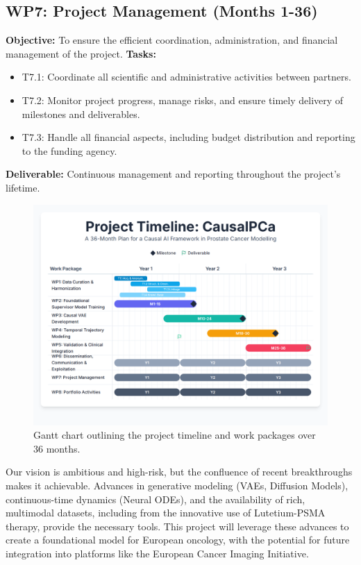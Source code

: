 \documentclass[11pt, a4paper]{article}
\begin{document}
\subsection*{WP7: Project Management (Months 1-36)}
\textbf{Objective:} To ensure the efficient coordination, administration, and financial management of the project.
\textbf{Tasks:}
\begin{itemize}
    \item T7.1: Coordinate all scientific and administrative activities between partners.
    \item T7.2: Monitor project progress, manage risks, and ensure timely delivery of milestones and deliverables.
    \item T7.3: Handle all financial aspects, including budget distribution and reporting to the funding agency.
\end{itemize}
\textbf{Deliverable:} Continuous management and reporting throughout the project's lifetime.

\begin{figure}[H]
    \centering
    \includegraphics[width=1\textwidth]{gantt.png}
    \caption{Gantt chart outlining the project timeline and work packages over 36 months.}
    \label{fig:gantt_chart}
\end{figure}

Our vision is ambitious and high-risk, but the confluence of recent breakthroughs makes it achievable. Advances in generative modeling (VAEs, Diffusion Models), continuous-time dynamics (Neural ODEs), and the availability of rich, multimodal datasets, including from the innovative use of Lutetium-PSMA therapy, provide the necessary tools. This project will leverage these advances to create a foundational model for European oncology, with the potential for future integration into platforms like the European Cancer Imaging Initiative.
\end{document}
